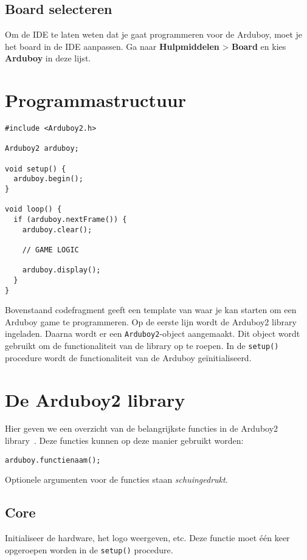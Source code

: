 \documentclass[11pt,fleqn]{book} %
\begin{document}
\subsection{Board selecteren}
Om de IDE te laten weten dat je gaat programmeren voor de Arduboy, moet je het board in de IDE aanpassen. Ga naar \textbf{Hulpmiddelen} > \textbf{Board} en kies \textbf{Arduboy} in deze lijst.

\section{Programmastructuur}

\begin{verbatim}
#include <Arduboy2.h>

Arduboy2 arduboy;

void setup() {
  arduboy.begin();
}

void loop() {
  if (arduboy.nextFrame()) {
    arduboy.clear();

    // GAME LOGIC
    
    arduboy.display();   
  }
}
\end{verbatim}
\noindent
Bovenstaand codefragment geeft een template van waar je kan starten om een Arduboy game te programmeren. Op de eerste lijn wordt de Arduboy2 library ingeladen. Daarna wordt er een \texttt{Arduboy2}-object aangemaakt. Dit object wordt gebruikt om de functionaliteit van de library op te roepen. In de \texttt{setup()} procedure wordt de functionaliteit van de Arduboy geïnitialiseerd. 

\section{De Arduboy2 library}
Hier geven we een overzicht van de belangrijkste functies in de Arduboy2 library~\cite{arduboy:lib2-doc}. Deze functies kunnen op deze manier gebruikt worden:

\begin{center}
	\texttt{arduboy.functienaam();}
\end{center}
\noindent
Optionele argumenten voor de functies staan \emph{schuingedrukt}.

\subsection{Core}

\begin{libf}[begin()]
	Initialiseer de hardware, het logo weergeven, etc. Deze functie moet één keer opgeroepen worden in de \texttt{setup()} procedure.
\end{libf}
\end{document}
